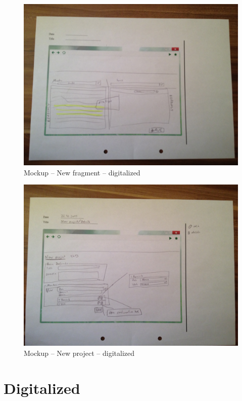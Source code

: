 \begin{appendix}
\begin{figure}[!h]
  \centering
    \includegraphics[width=\textwidth]{mockups/m_new_fragment.jpg}
  \caption{Mockup – New fragment – digitalized }
  \label{fig:1newCaseMockup}
\end{figure}

\begin{figure}[!h]
  \centering
    \includegraphics[width=\textwidth]{mockups/m_new_project.jpg}
  \caption{Mockup – New project – digitalized }
  \label{fig:mNewProjectMockup}
\end{figure}

\clearpage
\section{Digitalized}


\end{appendix}

